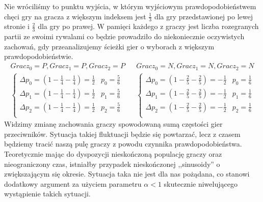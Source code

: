 Nie wróciliśmy to punktu wyjścia, w którym wyjściowym prawdopodobieństwem chęci gry na gracza z większym indeksem jest $\frac{1}{3}$ dla gry przedstawionej po lewej stronie i $\frac{2}{3}$ dla gry po prawej. W pamięci każdego z graczy jest liczba rozegranych partii ze swoimi rywalami co będzie prowadziło do niekoniecznie oczywistych zachowań, gdy przeanalizujemy ścieżki gier o wyborach z większym prawdopodobieństwie.
\begin{align*}
Gracz_0 = P, Gracz_1 = P, Gracz_2 = P && Gracz_0 = N, Gracz_1 = N, Gracz_2 = N \\
\left\{
\begin{array}{ll}
\Delta p_0 = (1 - \frac{1}{4} - \frac{1}{4}) =  \frac{1}{2} & p_0= \frac{5}{6}\\
\Delta p_1 = (1 - \frac{1}{4} - \frac{1}{4}) =  \frac{1}{2} & p_1= \frac{5}{6}\\
\Delta p_2 = (1 - \frac{1}{4} - \frac{1}{4}) =  \frac{1}{2} & p_2= \frac{5}{6}\\
\end{array} 
\right. &&
\left\{
\begin{array}{ll}
\Delta p_0 = (1 - \frac{2}{5} - \frac{2}{5}) =  -\frac{1}{2} & p_0= \frac{1}{6}\\
\Delta p_1 = (1 - \frac{2}{5} - \frac{2}{5}) =  -\frac{1}{2} & p_1= \frac{1}{6}\\
\Delta p_2 = (1 - \frac{2}{5} - \frac{2}{5}) =  -\frac{1}{2} & p_2= \frac{1}{6}\\
\end{array}
\right.
\end{align*}
Widzimy zmianę zachowania graczy spowodowaną sumą częstości gier przeciwników. Sytuacja takiej fluktuacji będzie się powtarzać, lecz z czasem będziemy tracić naszą pulę graczy z powodu czynnika prawdopodobieństwa. Teoretycznie mając do dyspozycji nieskończoną populację graczy oraz nieograniczony czas, istniałby przypadek nieskończonej ,,sinusoidy'' o zwiększającym się okresie. Sytuacja taka nie jest dla nas pożądana, co stanowi dodatkowy argument za użyciem parametru $\alpha < 1$ skutecznie niwelującego wystąpienie takich sytuacji.

